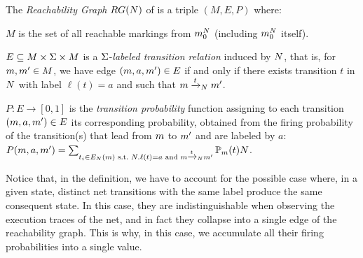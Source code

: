 \begin{definition}
The \emph{Reachability Graph} $RG(N)$ of \uswn \net is a triple $(M,E,P)$ where:
\begin{compactitem}[$\bullet$]
\item $M$ is the set of all reachable markings from $m_0^{N}$ (including $m_0^{N}$ itself).
\item $E \subseteq M \times \Sigma \times M$ is a $\Sigma$-\emph{labeled transition relation} induced by $N$, that is, for $m,m' \in M$, we have edge $(m,a,m') \in E$ if and only if there exists transition $t$ in $N$ with label $\ell(t) = a$ and such that $m\xrightarrow{t}_{N}m'$.
\item $P:E \rightarrow [0,1]$ is the \emph{transition probability} function assigning to each transition $(m,a,m') \in E$ its corresponding probability, obtained from the firing probability of the \uswn transition(s) that lead from $m$ to $m'$ and are labeled by $a$: $P(m,a,m') = \sum_{t_i \in E_{N}(m) \text{ s.t.~} N.\ell(t) = a \text{ and } m\xrightarrow{t}_{N}m'} \mathbb{P}_{m}(t){N}$.
\end{compactitem}
\end{definition}
Notice that, in the definition, we have to account for the possible case where, in a given state, distinct net transitions with the same label produce the same consequent state. In this case, they are indistinguishable when observing the execution traces of the net, and in fact they collapse into a single edge of the reachability graph. This is why, in this case, we accumulate all their firing probabilities into a single value.


